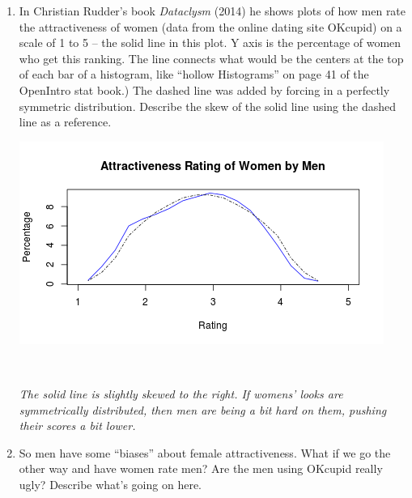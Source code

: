 \begin{enumerate}
\begin{enumerate}
\begin{key}
  {\it  Q1: \$90k, Mdedian: \$110k, Q3: \$135K, IQR: \$25k}
\end{key}
    \item For these data, which is a better summary: mean and standard
      deviation?  or median and IQR? Why?
\begin{students}
    \vspace{1cm}    
\end{students}

\begin{key}
  {\it median and IQR -- due to skewness.}
\end{key}
    \end{enumerate}


  \item In Christian Rudder's book {\it Dataclysm} (2014) he shows
    plots of how men rate the attractiveness of women (data from the
    online dating site OKcupid) on a scale of 1 to 5 -- the solid line
    in this plot.  Y axis is the percentage of women who get this
    ranking. The line connects what would be the centers at the top of
    each bar of a histogram, like ``hollow Histograms'' on page 41 of
    the OpenIntro stat book.)  The dashed line was added by forcing in
    a perfectly symmetric distribution. Describe the skew of the solid
    line using the dashed line as a reference. 


\includegraphics[width=.4\linewidth]{plots/menRateWomen.png}

\begin{students}
   \   \vspace{1cm}    
\end{students}

\begin{key}
  {\it The solid line is slightly skewed to the right. If womens'
    looks are symmetrically distributed, then men are being a bit hard
  on them, pushing their scores a bit lower.}
\end{key}


\item So men have some ``biases'' about female attractiveness.  What
  if we go the other way and have women rate men?  Are the men using
  OKcupid really ugly?  Describe what's going on here.


\end{enumerate}
